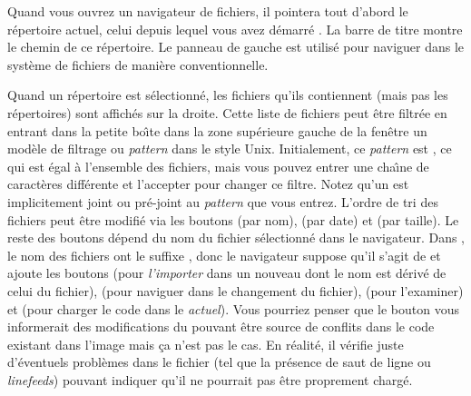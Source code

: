 \documentclass[a4paper,10pt,twoside]{book}
\begin{document}
Quand vous ouvrez un navigateur de fichiers, il pointera tout d'abord le r\'epertoire
actuel, \ie celui depuis lequel vous avez d\'emarr\'e \sq. La barre de titre
montre le chemin de ce r\'epertoire.
Le panneau de gauche est utilis\'e pour naviguer dans le syst\`eme de fichiers de mani\`ere
conventionnelle.

Quand un r\'epertoire est s\'electionn\'e, les fichiers qu'ils contiennent (mais pas les r\'epertoires) sont affich\'es sur la droite.
Cette liste de fichiers peut \^etre filtr\'ee en entrant dans la petite bo\^{\i}te
dans la zone sup\'erieure gauche de la fen\^etre un mod\`ele de filtrage ou 
\emph{pattern} dans le style Unix.
Initialement, ce \emph{pattern} est \ct{*}, ce qui est \'egal \`a l'ensemble des fichiers, mais vous pouvez entrer une cha\^{\i}ne de caract\`eres diff\'erente et l'accepter pour changer ce filtre. 
Notez qu'un \ct{*} est implicitement joint ou pr\'e-joint au \emph{pattern}
que vous entrez.
L'ordre de tri des fichiers peut \^etre modifi\'e via les boutons  (par nom),  (par date) et  (par taille).
Le reste des boutons d\'epend du nom du fichier s\'electionn\'e dans le navigateur.
Dans , le nom des fichiers ont le suffixe , donc le navigateur
suppose qu'il s'agit de \changeset et ajoute les boutons  (pour
\textit{l'importer} dans un nouveau \changeset dont le nom est d\'eriv\'e
de celui du fichier),  (pour naviguer dans le changement du fichier),
 (pour l'examiner) et  (pour charger
le code dans le \changeset \emph{actuel}).
Vous pourriez penser que le bouton  vous informerait 
des modifications du \changeset pouvant \^etre source de conflits dans le code existant
dans l'image mais \c{c}a n'est pas le cas.
En r\'ealit\'e, il v\'erifie juste d'\'eventuels probl\`emes dans le fichier (tel que
la pr\'esence de saut de ligne ou \textit{linefeeds})
pouvant indiquer qu'il ne pourrait pas \^etre proprement charg\'e.
\end{document}
